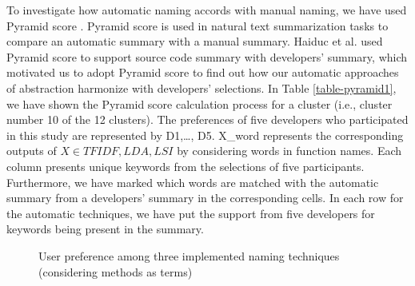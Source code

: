 To investigate how automatic naming accords with manual naming, we have used Pyramid score \cite{nenkova2004evaluating}. Pyramid score is used in natural text summarization tasks to compare an automatic summary with a manual summary. Haiduc et al. \cite{haiduc2010supporting}  used Pyramid score to support source code summary with developers' summary, which motivated us to adopt Pyramid score to find out how our automatic approaches of abstraction harmonize with developers' selections. In Table \ref{table-pyramid1}, we have shown the Pyramid score calculation process for a cluster (i.e., cluster number 10 of the 12 clusters). The preferences of five developers who participated in this study are represented by D1,\ldots, D5. X\_word represents the corresponding outputs of $X \in {TFIDF, LDA, LSI }$ by considering words in function names. Each column presents unique keywords from the selections of five participants. Furthermore, we have marked which words are matched with the automatic summary from a developers' summary in the corresponding cells. In each row for the automatic techniques, we have put the support from five developers for keywords being present in the summary.
\begin{figure}[h]
\dataset
{}
\caption{User preference among three implemented naming techniques (considering methods as terms)}
\label{fig:method}
\end{figure}


